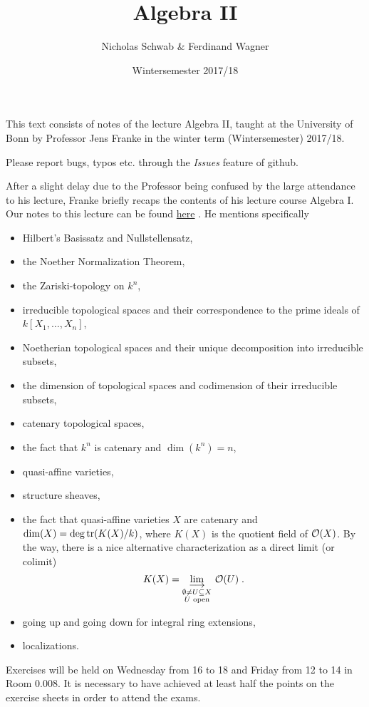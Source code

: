 \documentclass[a4paper,parskip=half,numbers=enddot, DIV=12]{scrreprt}
\title{Algebra II}
\author{Nicholas Schwab \& Ferdinand Wagner}
\date{Wintersemester 2017/18}
\begin{document}
\maketitle
{}
 \thispagestyle{plain}
This text consists of notes of the lecture Algebra II, taught at the University of Bonn by Professor Jens Franke in the winter term (Wintersemester) 2017/18. 

Please report bugs, typos etc. through the \emph{Issues} feature of github.

\tableofcontents

After a slight delay due to the Professor being confused by the large attendance to his lecture, Franke briefly recaps the contents of his lecture course Algebra I. Our notes to this lecture can be found \href{https://github.com/Nicholas42/AlgebraFranke/tree/master/AlgebraI}{here} \cite{alg1}. He mentions specifically
\begin{itemize}
 \item Hilbert's Basissatz and Nullstellensatz,
 \item the Noether Normalization Theorem,
 \item the Zariski-topology on $k^n$,
 \item irreducible topological spaces and their correspondence to the prime ideals of $k[X_1, \ldots, X_n]$,
 \item Noetherian topological spaces and their unique decomposition into irreducible subsets,
 \item the dimension of topological spaces and codimension of their irreducible subsets,
 \item catenary topological spaces,
 \item the fact that $k^n$ is catenary and $\dim(k^n) = n$,
 \item quasi-affine varieties,
 \item structure sheaves,
 \item the fact that quasi-affine varieties $X$ are catenary and $\dim (X) = \deg\operatorname{tr}(K(X)/k)$, where $K(X)$ is the quotient field of $\mathcal{O}(X)$. By the way, there is a nice alternative characterization as a direct limit (or colimit)
 \begin{align*}
 	K(X)=\colimit[\substack{\emptyset\not=U\subseteq X\\U\text{ open}}]\Oo(U)\;.
 \end{align*}
 \item going up and going down for integral ring extensions,
 \item localizations.
\end{itemize}
Exercises will be held on Wednesday from 16 to 18 and Friday from 12 to 14 in Room 0.008. It is necessary to have achieved at least half the points on the exercise sheets in order to attend the exams.
\end{document}
